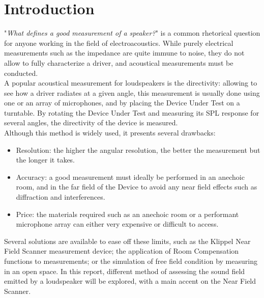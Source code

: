 \documentclass{report}
\begin{document}
    



\chapter*{Introduction}


"\textit{What defines a good measurement of a speaker?}" is a common rhetorical question for anyone working in the field of electroacoustics. While purely electrical measurements such as the impedance are quite immune to noise, they do not allow to fully characterize a driver, and acoustical measurements must be conducted. \\
A popular acoustical measurement for loudspeakers is the directivity: allowing to see how a driver radiates at a given angle, this measurement is usually done using one or an array of microphones, and by placing the Device Under Test on a turntable. By rotating the Device Under Test and measuring its SPL response for several angles, the directivity of the device is measured. \\

Although this method is widely used, it presents several drawbacks:
\begin{itemize}
\item Resolution: the higher the angular resolution, the better the measurement but the longer it takes. 
\item Accuracy: a good measurement must ideally be performed in an anechoic room, and in the far field of the Device to avoid any near field effects such as diffraction and interferences.
\item Price: the materials required such as an anechoic room or a performant microphone array can either very expensive or difficult to access. 
\end{itemize}

Several solutions are available to ease off these limits, such as the Klippel Near Field Scanner measurement device; the application of Room Compensation functions to measurements; or the simulation of free field condition by measuring in an open space. In this report,  different method of assessing the sound field emitted by a loudspeaker will be explored, with a main accent on the Near Field Scanner. \\
\end{document}
